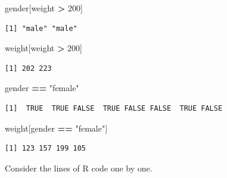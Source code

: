 \documentclass[
]{krantz}
\makeatletter
\newenvironment{Shaded}{\begin{snugshade}}{\end{snugshade}}
\newcommand{\DecValTok}[1]{\textcolor[rgb]{0.06,0.06,0.06}{#1}}
\newcommand{\NormalTok}[1]{#1}
\newcommand{\OperatorTok}[1]{\textcolor[rgb]{0.43,0.43,0.43}{\textbf{#1}}}
\newcommand{\StringTok}[1]{\textcolor[rgb]{0.5,0.5,0.5}{#1}}
\newenvironment{kframe}{%
\medskip{}
\setlength{\fboxsep}{.8em}
 \def\at@end@of@kframe{}%
 \ifinner\ifhmode%
  \def\at@end@of@kframe{\end{minipage}}%
  \begin{minipage}{\columnwidth}%
 \fi\fi%
 \def\FrameCommand##1{\hskip\@totalleftmargin \hskip-\fboxsep
 \colorbox{shadecolor}{##1}\hskip-\fboxsep
     \hskip-\linewidth \hskip-\@totalleftmargin \hskip\columnwidth}%
 \MakeFramed {\advance\hsize-\width
   \@totalleftmargin\z@ \linewidth\hsize
   \@setminipage}}%
 {\par\unskip\endMakeFramed%
 \at@end@of@kframe}
\renewenvironment{Shaded}{\begin{kframe}}{\end{kframe}}
\makeatother
\begin{document}
\begin{Shaded}
\begin{Highlighting}[]
\NormalTok{gender[weight }\OperatorTok{\textgreater{}}\StringTok{ }\DecValTok{200}\NormalTok{]}
\end{Highlighting}
\end{Shaded}

\begin{verbatim}
[1] "male" "male"
\end{verbatim}

\begin{Shaded}
\begin{Highlighting}[]
\NormalTok{weight[weight }\OperatorTok{\textgreater{}}\StringTok{ }\DecValTok{200}\NormalTok{]}
\end{Highlighting}
\end{Shaded}

\begin{verbatim}
[1] 202 223
\end{verbatim}

\begin{Shaded}
\begin{Highlighting}[]
\NormalTok{gender }\OperatorTok{==}\StringTok{ "female"}
\end{Highlighting}
\end{Shaded}

\begin{verbatim}
[1]  TRUE  TRUE FALSE  TRUE FALSE FALSE  TRUE FALSE
\end{verbatim}

\begin{Shaded}
\begin{Highlighting}[]
\NormalTok{weight[gender }\OperatorTok{==}\StringTok{ "female"}\NormalTok{]}
\end{Highlighting}
\end{Shaded}

\begin{verbatim}
[1] 123 157 199 105
\end{verbatim}

Consider the lines of R code one by one.
\end{document}
